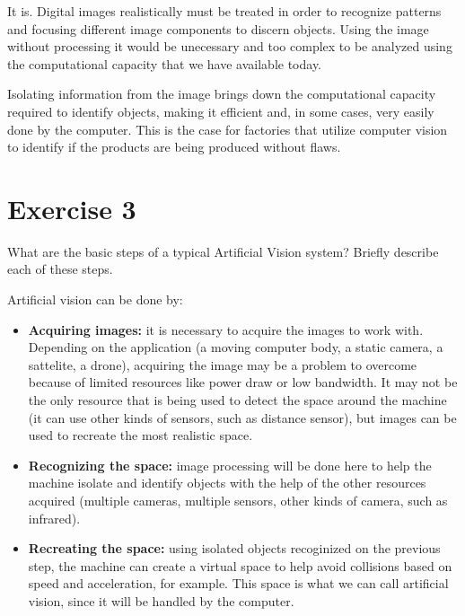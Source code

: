 \documentclass[english,a4paper]{article}
\begin{document}
  \begin{mdframed}
    \begin{small}
      It is. Digital images realistically must be treated in order to recognize patterns and focusing different image components to discern objects. Using the image without processing it would be unecessary and too complex to be analyzed using the computational capacity that we have available today.

      Isolating information from the image brings down the computational capacity required to identify objects, making it efficient and, in some cases, very easily done by the computer. This is the case for factories that utilize computer vision to identify if the products are being produced without flaws.
    \end{small}
  \end{mdframed}


\section*{Exercise 3}

  What are the basic steps of a typical Artificial Vision system? Briefly describe each of these steps.

  \begin{mdframed}
    \begin{small}
      Artificial vision can be done by:
      \begin{itemize}
        \item \textbf{Acquiring images:} it is necessary to acquire the images to work with. Depending on the application (a moving computer body, a static camera, a sattelite, a drone), acquiring the image may be a problem to overcome because of limited resources like power draw or low bandwidth. It may not be the only resource that is being used to detect the space around the machine (it can use other kinds of sensors, such as distance sensor), but images can be used to recreate the most realistic space.
        \item \textbf{Recognizing the space:} image processing will be done here to help the machine isolate and identify objects with the help of the other resources acquired (multiple cameras, multiple sensors, other kinds of camera, such as infrared).
        \item \textbf{Recreating the space:} using isolated objects recoginized on the previous step, the machine can create a virtual space to help avoid collisions based on speed and acceleration, for example. This space is what we can call artificial vision, since it will be handled by the computer.
      \end{itemize}
    \end{small}
  \end{mdframed}
\end{document}
